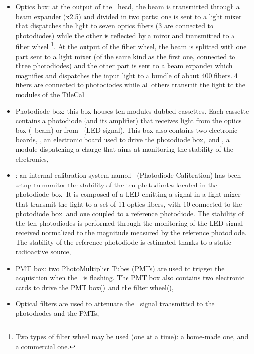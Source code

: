 \begin{itemize}
\item Optics box: at the output of the \laser~head, the beam is transmitted through a beam expander (x2.5) and divided in two parts: one is sent to a light mixer that dispatches the light to seven optics fibers (3 are connected to photodiodes) while the other is reflected by a miror and transmitted to a filter wheel \footnote{Two types of filter wheel may be used (one at a time): a home-made one, and a commercial one.}. At the output of the filter wheel, the beam is splitted with one part sent to a light mixer (of the same kind as the first one, connected to three photodiodes) and the other part is sent to a beam expander which magnifies and dispatches the input light to a bundle of about 400 fibers. 4 fibers are connected to photodiodes while all others transmit the light to the modules of the TileCal.

\item Photodiode box: this box houses ten modules dubbed cassettes. Each cassette contains a photodiode (and its amplifier) that receives light from the optics box (\laser~beam) or from \phocal~(LED signal). This box also contains two electronic boards, \licphd, an electronic board used to drive the photodiode box,~and \charinjsplit, a module dispatching a charge that aims at monitoring the stability of the electronics,

\item \phocal: an internal calibration system named \phocal~(Photodiode Calibration) has been setup to monitor the stability of the ten photodiodes located in the photodiode box. It is composed of a LED emitting a signal in a light mixer that transmit the light to a set of 11 optics fibers, with 10 connected to the photodiode box, and one coupled to a reference photodiode. 
The stability of the ten photodiodes is performed through the monitoring of the LED signal received normalized to the magnitude measured by the reference photodiode. The stability of the reference photodiode is estimated thanks to a static radioactive source,

\item PMT box: two PhotoMultiplier Tubes (PMTs) are used to trigger the acquisition when the \laser~is flashing. The PMT box also contains two electronic cards to drive the PMT box(\licpmt)~and the filter wheel(\licmot),

\item Optical filters are used to attenuate the \laser~signal transmitted to the photodiodes and the PMTs,


\end{itemize}

